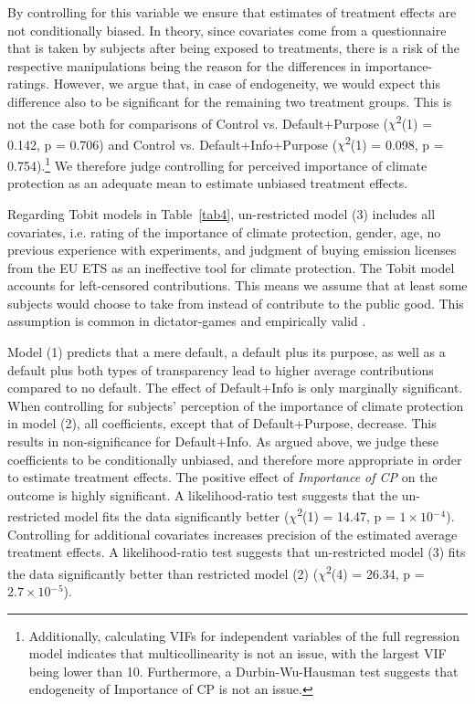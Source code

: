 \documentclass[review, authoryear,12pt]{elsarticle}
\begin{document}
By controlling for this variable we ensure that estimates of treatment effects are not conditionally biased. In theory, since covariates come from a questionnaire that is taken by subjects after being exposed to treatments, there is a risk of the respective manipulations being the reason for the differences in importance-ratings. However, we argue that, in case of endogeneity, we would expect this difference also to be significant for the remaining two treatment groups. This is not the case both for comparisons of Control vs. Default+Purpose ($\chi$\textsuperscript{2}(1) = 0.142, p = 0.706) and Control vs. Default+Info+Purpose ($\chi$\textsuperscript{2}(1) = 0.098, p = 0.754).\footnote{Additionally, calculating VIFs for independent variables of the full regression model indicates that multicollinearity is not an issue, with the largest VIF being lower than 10. Furthermore, a Durbin-Wu-Hausman test suggests that endogeneity of Importance of CP is not an issue.} We therefore judge controlling for perceived importance of climate protection as an adequate mean to estimate unbiased treatment effects.

Regarding Tobit models in Table~\ref{tab4}, un-restricted model (3) includes all covariates, i.e. rating of the importance of climate protection, gender, age, no previous experience with experiments, and judgment of buying emission licenses from the EU ETS as an ineffective tool for climate protection. The Tobit model accounts for left-censored contributions. This means we assume that at least some subjects would choose to take from instead of contribute to the public good. This assumption is common in dictator-games and empirically valid \citep{Engel.2011}.

Model (1) predicts that a mere default, a default plus its purpose, as well as a default plus both types of transparency lead to higher average contributions compared to no default. The effect of Default+Info is only marginally significant. When controlling for subjects' perception of the importance of climate protection in model (2), all coefficients, except that of Default+Purpose, decrease. This results in non-significance for Default+Info. As argued above, we judge these coefficients to be conditionally unbiased, and therefore more appropriate in order to estimate treatment effects. The positive effect of \textit{Importance of CP} on the outcome is highly significant. A likelihood-ratio test suggests that the un-restricted model fits the data significantly better ($\chi$\textsuperscript{2}(1) = 14.47, p = $1\times 10$$^-$$^4$). Controlling for additional covariates increases precision of the estimated average treatment effects. A likelihood-ratio test suggests that un-restricted model (3) fits the data significantly better than restricted model (2) ($\chi$\textsuperscript{2}(4) = 26.34, p = $2.7\times 10$$^-$$^5$).
\end{document}
